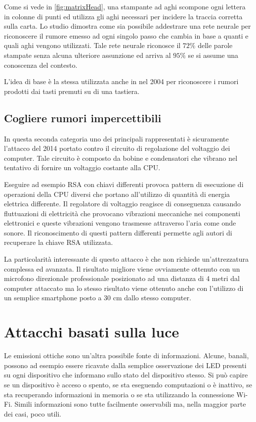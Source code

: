 			Come si vede in \cref{fig:matrixHead}, una stampante ad aghi scompone ogni lettera in colonne di punti ed utilizza gli aghi necessari per incidere la traccia corretta sulla carta. Lo studio dimostra come sia possibile addestrare una rete neurale per riconoscere il rumore emesso ad ogni singolo passo che cambia in base a quanti e quali aghi vengono utilizzati. Tale rete neurale riconosce il $72\%$ delle parole stampate senza alcuna ulteriore assunzione ed arriva al $95\%$ se si assume una conoscenza del contesto.
			
			L'idea di base è la stessa utilizzata anche in \cite{asonov2004keyboard} nel 2004 per riconoscere i rumori prodotti dai tasti premuti su di una tastiera.
		
		\subsection{Cogliere rumori impercettibili}	
			In questa seconda categoria uno dei principali rappresentati è sicuramente l'attacco\cite{genkin2014rsa} del 2014 portato contro il circuito di regolazione del voltaggio dei computer. Tale circuito è composto da bobine e condensatori che vibrano nel tentativo di fornire un voltaggio costante alla CPU.
			
			Eseguire ad esempio RSA con chiavi differenti provoca pattern di esecuzione di operazioni della CPU diversi che portano all'utilizzo di quantità di energia elettrica differente. Il regolatore di voltaggio reagisce di conseguenza causando fluttuazioni di elettricità che provocano vibrazioni meccaniche nei componenti elettronici e queste vibrazioni vengono trasmesse attraverso l'aria come onde sonore. Il riconoscimento di questi pattern differenti permette agli autori di recuperare la chiave RSA utilizzata.
			
			La particolarità interessante di questo attacco è che non richiede un'attrezzatura complessa ed avanzata. Il risultato migliore viene ovviamente ottenuto con un microfono direzionale professionale posizionato ad una distanza di 4 metri dal computer attaccato ma lo stesso risultato viene ottenuto anche con l'utilizzo di un semplice smartphone posto a 30 cm dallo stesso computer.
			
	\section{Attacchi basati sulla luce}
		Le emissioni ottiche sono un'altra possibile fonte di informazioni. Alcune, banali, possono ad esempio essere ricavate dalla semplice osservazione dei \acs{LED} presenti su ogni dispositivo che informano sullo stato del dispositivo stesso. Si può capire se un dispositivo è acceso o spento, se sta eseguendo computazioni o è inattivo, se sta recuperando informazioni in memoria o se sta utilizzando la connessione Wi-Fi. Simili informazioni sono tutte facilmente osservabili ma, nella maggior parte dei casi, poco utili.
		
